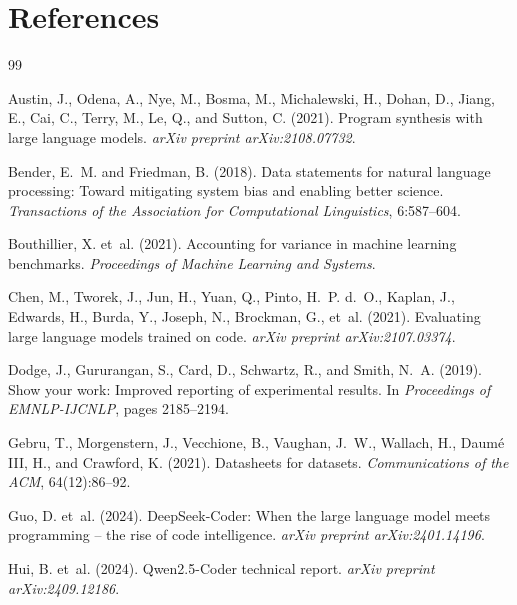 \documentclass{article}
\begin{document}
\section*{References}
{\small
\begin{thebibliography}{99}

Austin, J., Odena, A., Nye, M., Bosma, M., Michalewski, H., Dohan, D., Jiang, E., Cai, C., Terry, M., Le, Q., and Sutton, C. (2021).
\newblock Program synthesis with large language models.
\newblock \emph{arXiv preprint arXiv:2108.07732}.

Bender, E.~M. and Friedman, B. (2018).
\newblock Data statements for natural language processing: Toward mitigating system bias and enabling better science.
\newblock \emph{Transactions of the Association for Computational Linguistics}, 6:587--604.

Bouthillier, X. et~al. (2021).
\newblock Accounting for variance in machine learning benchmarks.
\newblock \emph{Proceedings of Machine Learning and Systems}.

Chen, M., Tworek, J., Jun, H., Yuan, Q., Pinto, H.~P. d.~O., Kaplan, J., Edwards, H., Burda, Y., Joseph, N., Brockman, G., et~al. (2021).
\newblock Evaluating large language models trained on code.
\newblock \emph{arXiv preprint arXiv:2107.03374}.

Dodge, J., Gururangan, S., Card, D., Schwartz, R., and Smith, N.~A. (2019).
\newblock Show your work: Improved reporting of experimental results.
\newblock In \emph{Proceedings of EMNLP-IJCNLP}, pages 2185--2194.

Gebru, T., Morgenstern, J., Vecchione, B., Vaughan, J.~W., Wallach, H., Daum\'e III, H., and Crawford, K. (2021).
\newblock Datasheets for datasets.
\newblock \emph{Communications of the ACM}, 64(12):86--92.

Guo, D. et~al. (2024).
\newblock DeepSeek-Coder: When the large language model meets programming -- the rise of code intelligence.
\newblock \emph{arXiv preprint arXiv:2401.14196}.

Hui, B. et~al. (2024).
\newblock Qwen2.5-Coder technical report.
\newblock \emph{arXiv preprint arXiv:2409.12186}.


\end{thebibliography}}
\end{document}
